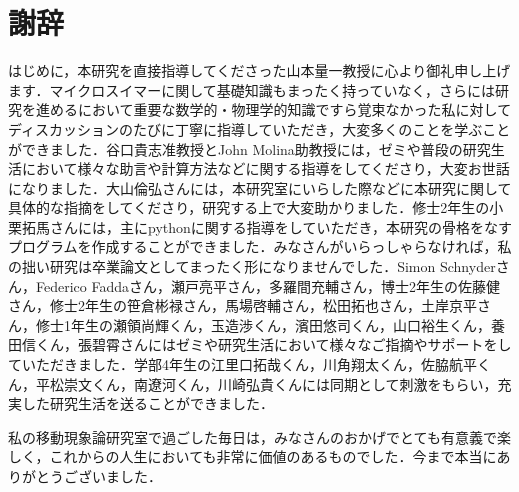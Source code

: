 \documentclass[11pt,a4j]{jarticle}
\begin{document}
\newpage
{}
\section*{謝辞}
\par はじめに，本研究を直接指導してくださった山本量一教授に心より御礼申し上げます．マイクロスイマーに関して基礎知識もまったく持っていなく，さらには研究を進めるにおいて重要な数学的・物理学的知識ですら覚束なかった私に対してディスカッションのたびに丁寧に指導していただき，大変多くのことを学ぶことができました．谷口貴志准教授とJohn Molina助教授には，ゼミや普段の研究生活において様々な助言や計算方法などに関する指導をしてくださり，大変お世話になりました．大山倫弘さんには，本研究室にいらした際などに本研究に関して具体的な指摘をしてくださり，研究する上で大変助かりました．修士2年生の小栗拓馬さんには，主にpythonに関する指導をしていただき，本研究の骨格をなすプログラムを作成することができました．みなさんがいらっしゃらなければ，私の拙い研究は卒業論文としてまったく形になりませんでした．Simon Schnyderさん，Federico Faddaさん，瀬戸亮平さん，多羅間充輔さん，博士2年生の佐藤健さん，修士2年生の笹倉彬禄さん，馬場啓輔さん，松田拓也さん，土岸京平さん，修士1年生の瀬領尚輝くん，玉造渉くん，濱田悠司くん，山口裕生くん，養田信くん，張碧霄さんにはゼミや研究生活において様々なご指摘やサポートをしていただきました．学部4年生の江里口拓哉くん，川角翔太くん，佐脇航平くん，平松崇文くん，南遼河くん，川崎弘貴くんには同期として刺激をもらい，充実した研究生活を送ることができました．
\par 私の移動現象論研究室で過ごした毎日は，みなさんのおかげでとても有意義で楽しく，これからの人生においても非常に価値のあるものでした．今まで本当にありがとうございました．
\end{document}
